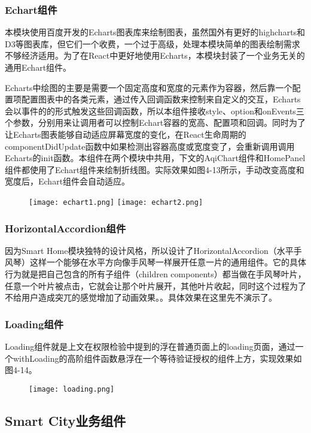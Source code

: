 \subsubsection{Echart组件}
本模块使用百度开发的Echarts图表库来绘制图表，虽然国外有更好的highcharts和D3等图表库，但它们一个收费，一个过于高级，处理本模块简单的图表绘制需求不够经济适用。为了在React中更好地使用Echarts，本模块封装了一个业务无关的通用Echart组件。

Echarts中绘图的主要是需要一个固定高度和宽度的元素作为容器，然后靠一个配置项配置图表中的各类元素，通过传入回调函数来控制来自定义的交互，Echarts会以事件的的形式触发这些回调函数，所以本组件接收style、option和onEvents三个参数，分别用来让调用者可以控制Echart容器的宽高、配置项和回调。同时为了让Echarts图表能够自动适应屏幕宽度的变化，在React生命周期的componentDidUpdate函数中如果检测出容器高度或宽度变了，会重新调用调用Echarts的init函数。本组件在两个模块中共用，下文的AqiChart组件和HomePanel组件都使用了Echart组件来绘制折线图。实际效果如图4-13所示，手动改变高度和宽度后，Echart组件会自动适应。
\begin{figure}[!htp]
 \centering
 \texttt{[image: echart1.png]}
 \texttt{[image: echart2.png]}
\end{figure}
\subsubsection{HorizontalAccordion组件}
因为Smart Home模块独特的设计风格，所以设计了HorizontalAccordion（水平手风琴）这样一个能够在水平方向像手风琴一样展开任意一片的通用组件。它的具体行为就是把自己包含的所有子组件（children components）都当做在手风琴叶片，任意一个叶片被点击，它就会让那个叶片展开，其他叶片收起，同时这个过程为了不给用户造成突兀的感觉增加了动画效果。。具体效果在这里先不演示了。
\subsubsection{Loading组件}
Loading组件就是上文在权限检验中提到的浮在普通页面上的loading页面，通过一个withLoading的高阶组件函数悬浮在一个等待验证授权的组件上方，实现效果如图4-14。
\begin{figure}[!htp]
 \centering
 \texttt{[image: loading.png]}
\end{figure}
\subsection{Smart City业务组件}
